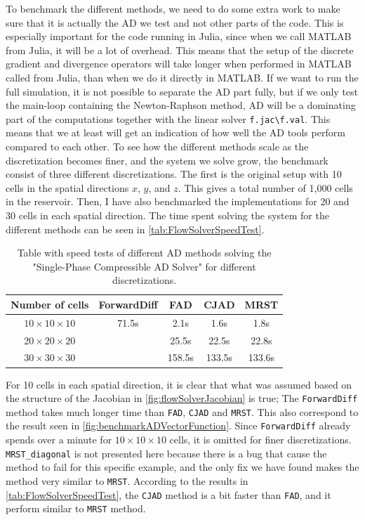 To benchmark the different methods, we need to do some extra work to make sure that it is actually the AD we test and not other parts of the code. This is especially important for the code running in Julia, since when we call MATLAB from Julia, it will be a lot of overhead. This means that the setup of the discrete gradient and divergence operators will take longer when performed in MATLAB called from Julia, than when we do it directly in MATLAB. If we want to run the full simulation, it is not possible to separate the AD part fully, but if we only test the main-loop containing the Newton-Raphson method, AD will be a dominating part of the computations together with the linear solver \texttt{f.jac\textbackslash f.val}. This means that we at least will get an indication of how well the AD tools perform compared to each other. To see how the different methods scale as the discretization becomes finer, and the system we solve grow, the benchmark consist of three different discretizations. The first is the original setup with 10 cells in the spatial directions $x$, $y$, and $z$. This gives a total number of 1,000 cells in the reservoir. Then, I have also benchmarked the implementations for 20 and 30 cells in each spatial direction. The time spent solving the system for the different methods can be seen in \autoref{tab:FlowSolverSpeedTest}.
\begin{table}[H]
    \centering
    \caption{Table with speed tests of different AD methods solving the "Single-Phase Compressible AD Solver" for different discretizations.}
    \label{tab:FlowSolverSpeedTest}
    \def\arraystretch{1.5}
    \begin{tabular}{ccccc}
    \textbf{Number of cells} & \textbf{ForwardDiff} & \textbf{FAD} & \textbf{CJAD} & \textbf{MRST}\\
        \hline
         $10\times10\times10$ & 71.5s & 2.1s & 1.6s & 1.8s  \\  
         $20\times20\times20$ & ~ & 25.5s & 22.5s & 22.8s \\ 
         $30\times30\times30$ & ~ & 158.5s & 133.5s & 133.6s \\ \hline
    \end{tabular}
\end{table}
For 10 cells in each spatial direction, it is clear that what was assumed based on the structure of the Jacobian in \autoref{fig:flowSolverJacobian} is true; The  \texttt{ForwardDiff} method takes much longer time than  \texttt{FAD}, \texttt{CJAD} and \texttt{MRST}. This also correspond to the result seen in \autoref{fig:benchmarkADVectorFunction}. Since \texttt{ForwardDiff} already spends over a minute for $10\times 10\times 10$ cells, it is omitted for finer discretizations. \texttt{MRST\_diagonal} is not presented here because there is a bug that cause the method to fail for this specific example, and the only fix we have found makes the method very similar to \texttt{MRST}. According to the results in \autoref{tab:FlowSolverSpeedTest}, the \texttt{CJAD} method is a bit faster than  \texttt{FAD}, and it perform similar to \texttt{MRST} method. 

